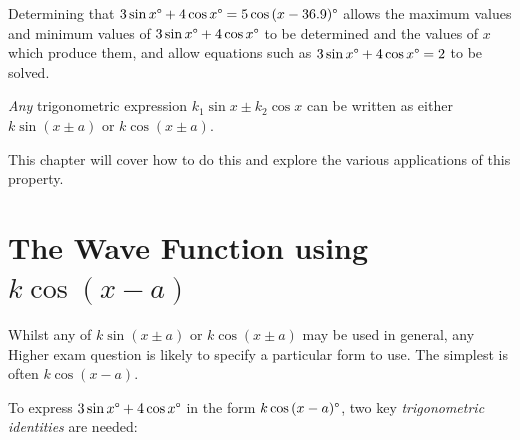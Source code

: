 \documentclass[
  11pt,
  openany]{book}
\begin{document}
\begin{center}
\end{center}

Determining that \(3\sin{x}\degree+4\cos{x}\degree=5\cos{(x-36.9)}\degree\) allows the maximum values and minimum values of \(3\sin{x}\degree+4\cos{x}\degree\) to be determined and the values of \(x\) which produce them, and allow equations such as \(3\sin{x}\degree+4\cos{x}\degree=2\) to be solved.

\emph{Any} trigonometric expression \(k_1\sin{x}\pm k_2\cos{x}\) can be written as either \(k\sin{(x\pm a)}\) or \(k\cos{(x\pm a)}\).

This chapter will cover how to do this and explore the various applications of this property.

\pagebreak

\section{\texorpdfstring{The Wave Function using \(k\cos{(x-a)}\)}{The Wave Function using k\textbackslash cos\{(x-a)\}}}\label{the-wave-function-using-kcosx-a}

\vspace{-0.5cm}

Whilst any of \(k\sin{(x\pm a)}\) or \(k\cos{(x\pm a)}\) may be used in general, any Higher exam question is likely to specify a particular form to use. The simplest is often \(k\cos{(x-a)}\).

To express \(3\sin{x}\degree+4\cos{x}\degree\) in the form \(k\cos{(x-a)}\degree\), two key \emph{trigonometric identities} are needed:
\end{document}
